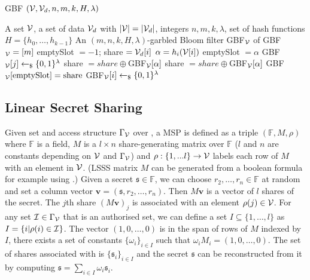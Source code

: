 \begin{algorithm}[htb]
\caption{GBF $(\mathcal{V}, \mathcal{V}_d , n, m, k, H, \lambda)$}
\label{alg:gbf}
\begin{algorithmic}[1]
\REQUIRE A set $\mathcal{V}$, a set of data $\mathcal{V}_d$ with $|\mathcal{V}|=|\mathcal{V}_d|$, integers $n, m, k, \lambda$, set of hash functions $H=\{h_0, \dots, h_{k-1}\}$
\ENSURE An $(m, n, k, H, \lambda)$-garbled Bloom filter GBF$_\mathcal{V}$ of \key
\STATE GBF$_\mathcal{V} = [m]$ 
  \STATE emptySlot $= -1$; share $=\mathcal{V}_d[i]$
    \STATE $\alpha=h_i(\mathcal{V}[i])$
        \STATE emptySlot $= \alpha$
        \ELSE
          \STATE GBF$_\mathcal{V}[j] \gets_{\$} \{0,1\}^\lambda$
          \STATE share $= share \oplus$GBF$_\mathcal{V}[\alpha]$
      \ENDIF
      \ELSE
        \STATE share $= share \oplus$GBF$_\mathcal{V}[\alpha]$
    \ENDIF
  \ENDFOR
  \STATE GBF$_\mathcal{V}[\text{emptySlot}]=\text{share}$
\ENDFOR
{}
    \STATE GBF$_\mathcal{V}[i] \gets_{\$} \{0,1\}^\lambda$
  \ENDIF
\ENDFOR
\end{algorithmic}
\end{algorithm}

\subsection{Linear Secret Sharing}
Given set \ServerSet and access structure $\Gamma_\mathcal{V}$ over \ServerSet, a \ac{MSP} is defined as a triple $(\mathbb{F},M,\rho)$ where $\mathbb{F}$ is a field, $M$ is a $l\times n$ share-generating matrix over $\mathbb{F}$ ($l$ and $n$ are constants depending on  $\mathcal{V}$ and $\Gamma_\mathcal{V}$) and $\rho:\{1,...l\}\rightarrow \mathcal{V}$ labels each row of $M$ with an element in $\mathcal{V}$. 
(\ac{LSSS} matrix $M$ can be generated from a boolean formula for example using \citet[Algorithm 1]{LiuC10}.)
Given a secret $\mathfrak{s}\in \mathbb{F}$, we can choose $r_2,\ldots,r_n \in \mathbb{F}$ at random and set a column vector $\mathbf{v}=(\mathfrak{s},r_2,\ldots,r_n)$. 
Then $M\mathbf{v}$ is a vector of $l$ shares of the secret. 
The $j$th share $(M\mathbf{v})_{j}$ is associated with an element $\rho(j) \in \mathcal{V}$. 
For any set $\mathcal{I}\in \Gamma_\mathcal{V}$ that is an authorised set, we can define a set $I\subseteq \{1,\ldots,l\}$ as $I=\{i|\rho(i)\in \mathcal{I}\}$. 
The vector $(1,0,\ldots,0)$ is in the span of rows of $M$ indexed by $I$, \ie there exists a set of constants $\{\omega_i\}_{i\in I}$ such that $\omega_iM_i=(1,0,\ldots,0)$. 
The set of shares associated with \ClientSet is $\{\mathfrak{s}_i\}_{i\in I}$ and the secret $\mathfrak{s}$ can be reconstructed from it by computing $\mathfrak{s}=\sum_{i\in I}\omega_i\mathfrak{s}_i$.

